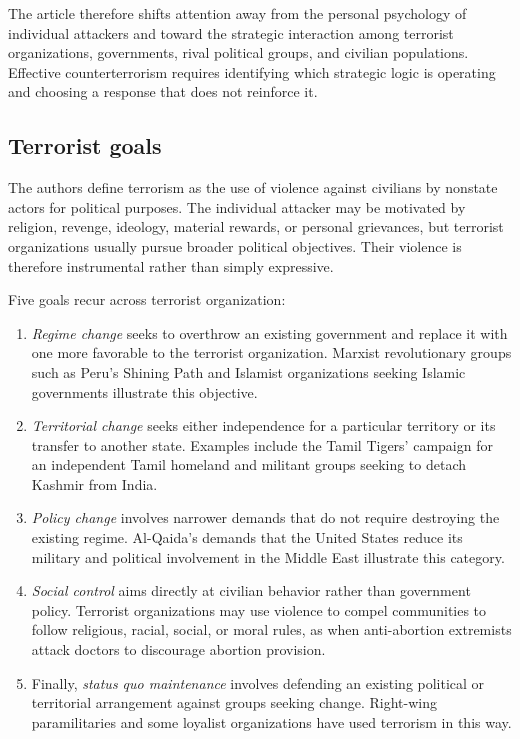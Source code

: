 The article therefore shifts attention away from the personal psychology of individual attackers and toward the strategic interaction among terrorist organizations, governments, rival political groups, and civilian populations. Effective counterterrorism requires identifying which strategic logic is operating and choosing a response that does not reinforce it.

\subsection{Terrorist goals}

The authors define terrorism as the use of violence against civilians by nonstate actors for political purposes. The individual attacker may be motivated by religion, revenge, ideology, material rewards, or personal grievances, but terrorist organizations usually pursue broader political objectives. Their violence is therefore instrumental rather than simply expressive.

Five goals recur across terrorist organization:

\begin{enumerate}
    \item \textit{Regime change} seeks to overthrow an existing government and replace it with one more favorable to the terrorist organization. Marxist revolutionary groups such as Peru's Shining Path and Islamist organizations seeking Islamic governments illustrate this objective.
    
    \item \textit{Territorial change} seeks either independence for a particular territory or its transfer to another state. Examples include the Tamil Tigers' campaign for an independent Tamil homeland and militant groups seeking to detach Kashmir from India.
    
    \item \textit{Policy change} involves narrower demands that do not require destroying the existing regime. Al-Qaida's demands that the United States reduce its military and political involvement in the Middle East illustrate this category.
    
    \item \textit{Social control} aims directly at civilian behavior rather than government policy. Terrorist organizations may use violence to compel communities to follow religious, racial, social, or moral rules, as when anti-abortion extremists attack doctors to discourage abortion provision.
    
    \item Finally, \textit{status quo maintenance} involves defending an existing political or territorial arrangement against groups seeking change. Right-wing paramilitaries and some loyalist organizations have used terrorism in this way.
\end{enumerate}

